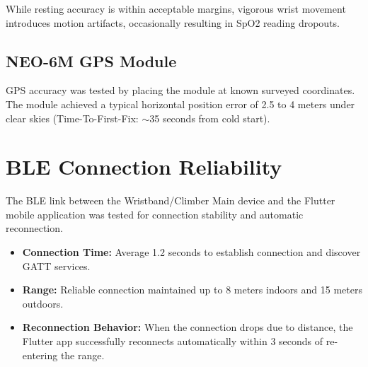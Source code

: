 \begin{table}[htbp]
    \centering
    \caption{MAX30102 Accuracy Comparison (Resting State, N=50 samples)}
    \label{tab:max_accuracy}
\end{table}

\begin{warningbox}
While resting accuracy is within acceptable margins, vigorous wrist movement introduces motion artifacts, occasionally resulting in SpO2 reading dropouts.
\end{warningbox}

\subsection{NEO-6M GPS Module}
GPS accuracy was tested by placing the module at known surveyed coordinates. The module achieved a typical horizontal position error of 2.5 to 4 meters under clear skies (Time-To-First-Fix: $\sim$35 seconds from cold start).

\section{BLE Connection Reliability}
\label{sec:ble_testing}

The BLE link between the Wristband/Climber Main device and the Flutter mobile application was tested for connection stability and automatic reconnection.

\begin{itemize}
    \item \textbf{Connection Time:} Average 1.2 seconds to establish connection and discover GATT services.
    \item \textbf{Range:} Reliable connection maintained up to 8 meters indoors and 15 meters outdoors.
    \item \textbf{Reconnection Behavior:} When the connection drops due to distance, the Flutter app successfully reconnects automatically within 3 seconds of re-entering the range.
\end{itemize}

